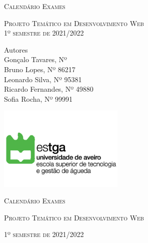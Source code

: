 \documentclass[11pt, twoside]{report}
\begin{document}
	
\onehalfspacing%

	
	
	\begin{titlepage}
		\centering
		\scshape\Huge Calendário Exames\par
		\vspace{0.9cm}
		
		\scshape\large Projeto Temático em Desenvolvimento Web \\
		\vspace{0.3cm}
		\scshape\large 1º semestre de 2021/2022\par
		\vspace{0.4cm}
		\centering
		
		\vspace{1cm}
		
		\large
		Autores\\
		Gonçalo Tavares, Nº   \\
		Bruno Lopes, Nº 86217 \\
		Leonardo Silva, Nº 95381 \\
		Ricardo Fernandes, Nº 49880 \\
		Sofia Rocha, Nº 99991 \\
		
		\vspace{1cm}
		
		\centering
		\includegraphics[width=6cm]{logoestga}
		
		\newpage
		\thispagestyle{plain}%
		\thispagestyle{empty}%
		\centering
		\scshape\Huge Calendário Exames \par
		\vspace{1cm}
		
		\scshape\large Projeto Temático em Desenvolvimento Web\par
		\vspace{1cm}
		\scshape\large 1º semestre de 2021/2022\par
		\vspace{4cm}
		

\end{titlepage}
\end{document}
